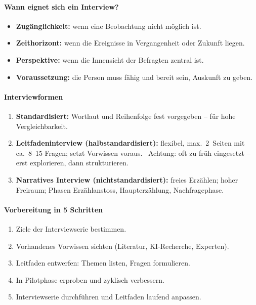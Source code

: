 \paragraph{Wann eignet sich ein Interview?}
\begin{itemize}[nosep]
  \item \textbf{Zugänglichkeit:} wenn eine Beobachtung nicht möglich ist.
  \item \textbf{Zeithorizont:} wenn die Ereignisse in Vergangenheit oder Zukunft liegen.
  \item \textbf{Perspektive:} wenn die Innensicht der Befragten zentral ist.
  \item \textbf{Voraussetzung:} die Person muss fähig und bereit sein, Auskunft zu geben.
\end{itemize}

\paragraph{Interviewformen}
\begin{enumerate}[nosep]
  \item \textbf{Standardisiert:} Wortlaut und Reihenfolge fest vorgegeben -- für hohe Vergleichbarkeit.
  \item \textbf{Leitfadeninterview (halbstandardisiert):} flexibel, max.\ 2~Seiten mit ca.\ 8--15 Fragen; setzt Vorwissen voraus. ~Achtung: oft zu früh eingesetzt -- erst explorieren, dann strukturieren.
  \item \textbf{Narratives Interview (nichtstandardisiert):} freies Erzählen; hoher Freiraum; Phasen Erzählanstoss, Haupterzählung, Nachfragephase.
\end{enumerate}

\paragraph{Vorbereitung in 5 Schritten}
\begin{enumerate}[nosep]
  \item Ziele der Interviewserie bestimmen.
  \item Vorhandenes Vorwissen sichten (Literatur, KI-Recherche, Experten).
  \item Leitfaden entwerfen: Themen listen, Fragen formulieren.
  \item In Pilotphase erproben und zyklisch verbessern.
  \item Interviewserie durchführen und Leitfaden laufend anpassen.
\end{enumerate}

